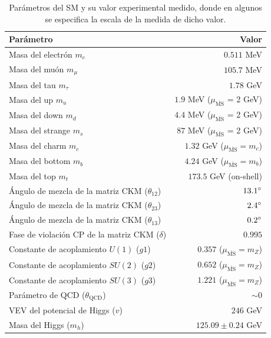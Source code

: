 \begin{table} 
	
	\centering
	\begin{tabular}{ l | r }

	\hline

		Parámetro & Valor \\

		\hline

    Masa del electrón $m_e$ & $0.511$ MeV \\
    Masa del muón $m_{\mu}$ & $105.7$ MeV \\
    Masa del tau $m_{\tau}$ & $1.78$ GeV \\
    Masa del up $m_u$ & $1.9$ MeV ($\mu_{\bar{\text{MS}}}$ = 2 GeV) \\
    Masa del down $m_d$ & $4.4$ MeV ($\mu_{\bar{\text{MS}}}$ = 2 GeV) \\
    Masa del strange $m_s$ & $87$ MeV ($\mu_{\bar{\text{MS}}}$ = 2 GeV) \\
    Masa del charm $m_c$ & $1.32$ GeV ($\mu_{\bar{\text{MS}}} = m_c$) \\
    Masa del bottom $m_b$ & $4.24$ GeV ($\mu_{\bar{\text{MS}}} = m_b$) \\
    Masa del top $m_t$ & $173.5$ GeV (on-shell)\\
    Ángulo de mezcla de la matriz CKM ($\theta_{12}$) & $13.1\degree$ \\
    Ángulo de mezcla de la matriz CKM ($\theta_{23}$) & $2.4\degree$ \\
    Ángulo de mezcla de la matriz CKM ($\theta_{13}$) & $0.2\degree$ \\
    Fase de violación CP de la matriz CKM ($\delta$) & $0.995$ \\
    Constante de acoplamiento $U(1)$ ($g1$) & $0.357$ ($\mu_{\bar{\text{MS}}} = m_Z$) \\
    Constante de acoplamiento $SU(2)$ ($g2$) & $0.652$ ($\mu_{\bar{\text{MS}}} = m_Z$) \\
    Constante de acoplamiento $SU(3)$ ($g3$) & $1.221$ ($\mu_{\bar{\text{MS}}} = m_Z$) \\
    Parámetro de QCD ($\theta_{\text{QCD}}$) & $\sim 0$ \\
    VEV del potencial de Higgs ($v$) & $246$ GeV \\
    Masa del Higgs ($m_h$) & $125.09\pm0.24$ GeV \\

    \hline

	\end{tabular}
	\caption{Parámetros del SM y su valor experimental medido, donde en algunos se especifica la escala de la medida de dicho valor.}
	\label{tab:sm_para}
\end{table}


